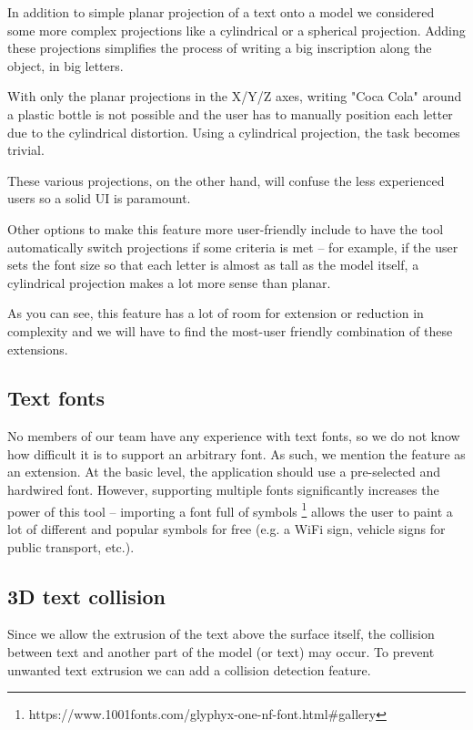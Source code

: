 In addition to simple planar projection of a text onto a model we considered some more complex projections like a cylindrical or a spherical projection. Adding these projections simplifies the process of writing a big inscription along the object, in big letters.

With only the planar projections in the X/Y/Z axes, writing "Coca Cola" around a plastic bottle is not possible and the user has to manually position each letter due to the cylindrical distortion. Using a cylindrical projection, the task becomes trivial.

These various projections, on the other hand, will confuse the less experienced users so a solid UI is paramount.

Other options to make this feature more user-friendly include to have the tool automatically switch projections if some criteria is met -- for example, if the user sets the font size so that each letter is almost as tall as the model itself, a cylindrical projection makes a lot more sense than planar.

As you can see, this feature has a lot of room for extension or reduction in complexity and we will have to find the most-user friendly combination of these extensions.

\subsection{Text fonts}

No members of our team have any experience with text fonts, so we do not know how difficult it is to support an arbitrary font. As such, we mention the feature as an extension. At the basic level, the application should use a pre-selected and hardwired font. However, supporting multiple fonts significantly increases the power of this tool -- importing a font full of symbols \footnote{https://www.1001fonts.com/glyphyx-one-nf-font.html\#gallery} allows the user to paint a lot of different and popular symbols for free (e.g. a WiFi sign, vehicle signs for public transport, etc.).

\subsection{3D text collision}

Since we allow the extrusion of the text above the surface itself, the collision between text and another part of the model (or text) may occur. To prevent unwanted text extrusion we can add a collision detection feature.


